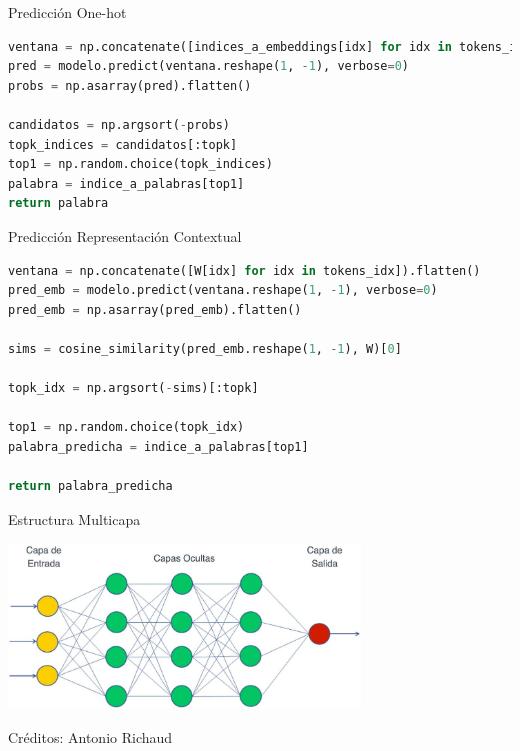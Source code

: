 \documentclass{beamer}
\begin{document}
\begin{frame}[fragile]{Predicción One-hot}
	\begin{lstlisting}[language=Python]
ventana = np.concatenate([indices_a_embeddings[idx] for idx in tokens_idx]).flatten()
pred = modelo.predict(ventana.reshape(1, -1), verbose=0)
probs = np.asarray(pred).flatten()

candidatos = np.argsort(-probs)
topk_indices = candidatos[:topk]
top1 = np.random.choice(topk_indices)
palabra = indice_a_palabras[top1]
return palabra
	\end{lstlisting}
\end{frame}

\begin{frame}[fragile]{Predicción Representación Contextual}
	\begin{lstlisting}[language=Python]
ventana = np.concatenate([W[idx] for idx in tokens_idx]).flatten()
pred_emb = modelo.predict(ventana.reshape(1, -1), verbose=0)
pred_emb = np.asarray(pred_emb).flatten()

sims = cosine_similarity(pred_emb.reshape(1, -1), W)[0]

topk_idx = np.argsort(-sims)[:topk]

top1 = np.random.choice(topk_idx)
palabra_predicha = indice_a_palabras[top1]

return palabra_predicha
	\end{lstlisting}
\end{frame}

\begin{frame}{Estructura Multicapa}
	\begin{center}
		\includegraphics[width=0.7\textwidth]{redes perceptron multicapa.jpg}
		
		\vspace{0.5em}
		{\tiny Créditos: Antonio Richaud}
	\end{center}
\end{frame}
\end{document}
